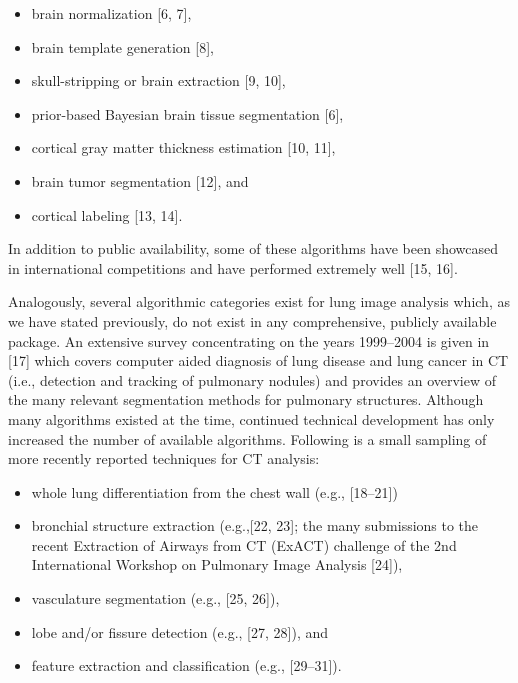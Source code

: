 \documentclass[11pt,]{article}
\begin{document}
\begin{itemize}
\itemsep1pt\parskip0pt
\item
  brain normalization {[}6, 7{]},
\item
  brain template generation {[}8{]},
\item
  skull-stripping or brain extraction {[}9, 10{]},
\item
  prior-based Bayesian brain tissue segmentation {[}6{]},
\item
  cortical gray matter thickness estimation {[}10, 11{]},
\item
  brain tumor segmentation {[}12{]}, and
\item
  cortical labeling {[}13, 14{]}.
\end{itemize}

In addition to public availability, some of these algorithms have been
showcased in international competitions and have performed extremely
well {[}15, 16{]}.

Analogously, several algorithmic categories exist for lung image
analysis which, as we have stated previously, do not exist in any
comprehensive, publicly available package. An extensive survey
concentrating on the years 1999--2004 is given in {[}17{]} which covers
computer aided diagnosis of lung disease and lung cancer in CT (i.e.,
detection and tracking of pulmonary nodules) and provides an overview of
the many relevant segmentation methods for pulmonary structures.
Although many algorithms existed at the time, continued technical
development has only increased the number of available algorithms.
Following is a small sampling of more recently reported techniques for
CT analysis:

\begin{itemize}
\itemsep1pt\parskip0pt
\item
  whole lung differentiation from the chest wall (e.g., {[}18--21{]})
\item
  bronchial structure extraction (e.g.,{[}22, 23{]}; the many
  submissions to the recent Extraction of Airways from CT (ExACT)
  challenge of the 2nd International Workshop on Pulmonary Image
  Analysis {[}24{]}),
\item
  vasculature segmentation (e.g., {[}25, 26{]}),
\item
  lobe and/or fissure detection (e.g., {[}27, 28{]}), and
\item
  feature extraction and classification (e.g., {[}29--31{]}).
\end{itemize}
\end{document}
